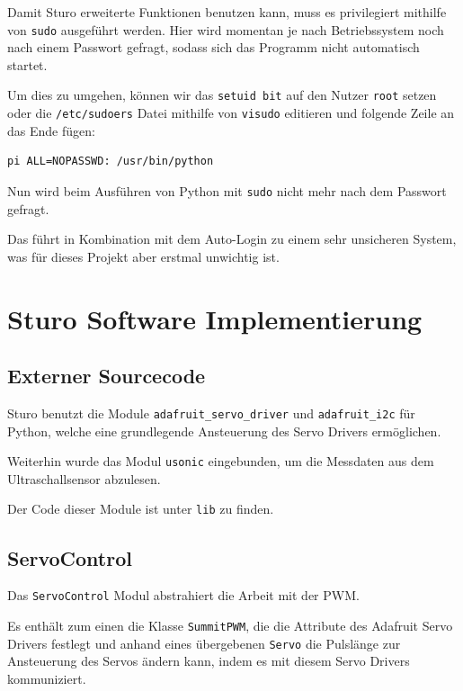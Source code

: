\documentclass[a4paper,10pt]{scrartcl}
\begin{document}
    Damit Sturo erweiterte Funktionen benutzen kann, muss es privilegiert
    mithilfe von \lstinline{sudo} ausgeführt werden.
    Hier wird momentan je nach Betriebssystem noch nach einem Passwort gefragt,
    sodass sich das Programm nicht automatisch startet.

    Um dies zu umgehen, können wir das \lstinline{setuid bit} auf den Nutzer
    \lstinline{root} setzen oder die \lstinline{/etc/sudoers} Datei mithilfe von
    \lstinline{visudo} editieren und folgende Zeile an das Ende fügen:
    \begin{lstlisting}
pi ALL=NOPASSWD: /usr/bin/python
    \end{lstlisting}

    Nun wird beim Ausführen von Python mit \lstinline{sudo} nicht mehr nach dem
    Passwort gefragt.

    Das führt in Kombination mit dem Auto-Login zu einem sehr unsicheren System,
    was für dieses Projekt aber erstmal unwichtig ist.

\section{Sturo Software Implementierung}

  \subsection{Externer Sourcecode}
    Sturo benutzt die Module \lstinline{adafruit_servo_driver} und
    \lstinline{adafruit_i2c} für Python, welche eine grundlegende Ansteuerung
    des Servo Drivers ermöglichen. \cite{adafruitlearn}

    Weiterhin wurde das Modul \lstinline{usonic} eingebunden, um die Messdaten
    aus dem Ultraschallsensor abzulesen. \cite{ultrasonic}

    Der Code dieser Module ist unter \lstinline{lib} zu finden.

  \subsection{ServoControl}

    Das \lstinline{ServoControl} Modul abstrahiert die Arbeit mit der PWM.

    Es enthält zum einen die Klasse \lstinline{SummitPWM}, die die Attribute des
    Adafruit Servo Drivers festlegt und anhand eines übergebenen
    \lstinline{Servo} die Pulslänge zur Ansteuerung des Servos ändern kann,
    indem es mit diesem Servo Drivers kommuniziert.
\end{document}
